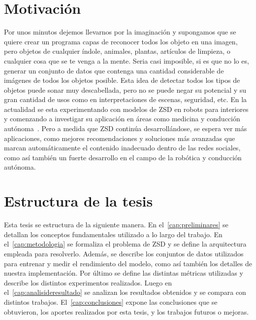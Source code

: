 \section{Motivación} \label{sec:motivacion}

Por unos minutos dejemos llevarnos por la imaginación y supongamos que se quiere crear un programa capas de reconocer todos los objeto en una imagen, pero objetos de cualquier índole, animales, plantas, artículos de limpieza, o cualquier cosa que se te venga a la mente. Seria casi imposible, si es que no lo es, generar un conjunto de datos que contenga una cantidad considerable de imágenes de todos los objetos posible. Esta idea de detectar todos los tipos de objetos puede sonar muy descabellada, pero no se puede negar su potencial y su gran cantidad de usos como en interpretaciones de escenas, seguridad, etc. En la actualidad se esta experimentando con modelos de ZSD en robots para interiores~\cite{abdalwhab2019zero} y comenzando a investigar su aplicación en áreas como medicina y conducción autónoma~\cite{rezaei2020zero}. Pero a medida que ZSD continúa desarrollándose, se espera ver más aplicaciones, como mejores recomendaciones y soluciones más avanzadas que marcan automáticamente el contenido inadecuado dentro de las redes sociales, como así también un fuerte desarrollo en el campo de la robótica y conducción autónoma.


\section{Estructura de la tesis} \label{sec:estructuradelatesis}

Esta tesis se estructura de la siguiente manera. En el~\autoref{cap:preliminares} se detallan los conceptos fundamentales utilizado a lo largo del trabajo. En el~\autoref{cap:metodologia} se formaliza el problema de ZSD y se define la arquitectura empleada para resolverlo. Además, se describe los conjuntos de datos utilizados para entrenar y medir el rendimiento del modelo, como así también los detalles de nuestra implementación. Por último se define las distintas métricas utilizadas y describe los distintos experimentos realizados. Luego en el~\autoref{cap:analisideresultado} se analizan los resultados obtenidos y se compara con distintos trabajos. El~\autoref{cap:conclusiones} expone las conclusiones que se obtuvieron, los aportes realizados por esta tesis, y los trabajos futuros o mejoras.
